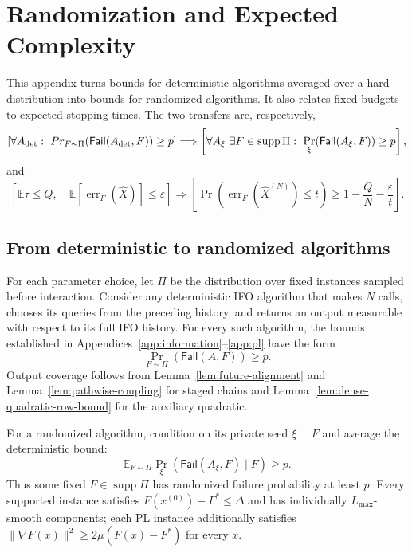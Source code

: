 \documentclass{article}
\newcommand{\E}{\mathbb{E}}
\theoremstyle{definition}
\begin{document}
\section{Randomization and Expected Complexity}
\label{app:stopping}

This appendix turns bounds for deterministic algorithms averaged over a hard
distribution into bounds for randomized algorithms.  It also relates fixed
budgets to expected stopping times.
The two transfers are, respectively,
\begin{equation*}
 \left[
 \forall A_{\rm det}:\ Pr_{F\sim\Pi}(\mathsf{Fail}(A_{\rm det},F))\ge p
 \right]
 \Longrightarrow
 \left[
 \forall A_\xi\ \exists F\in\operatorname{supp}\Pi:\
 \Pr_\xi(\mathsf{Fail}(A_\xi,F))\ge p
 \right],
\end{equation*}
and
\begin{equation*}
 \left[
 \E\tau\le Q,\quad
 \E[\operatorname{err}_F(\widehat X)]\le\varepsilon
 \right]
 \Longrightarrow
 \left[
 \Pr\!\left(\operatorname{err}_F(\widehat X^{(N)})\le t\right)
 \ge1-\frac{Q}{N}-\frac{\varepsilon}{t}
 \right].
\end{equation*}

\subsection{From deterministic to randomized algorithms}
\label{sec:deterministic-to-randomized}

For each parameter choice, let $\Pi$ be the distribution over fixed instances
sampled before interaction.  Consider any deterministic IFO algorithm that
makes $N$ calls, chooses its queries from the preceding history, and returns an
output measurable with respect to its full IFO history.  For every such
algorithm, the bounds established in
Appendices~\ref{app:information}--\ref{app:pl} have the form
\[
 \Pr_{F\sim\Pi}(\mathsf{Fail}(A,F))\ge p.
\]
Output coverage follows from Lemma~\ref{lem:future-alignment} and
Lemma~\ref{lem:pathwise-coupling}
for staged chains and Lemma~\ref{lem:dense-quadratic-row-bound} for the
auxiliary quadratic.

For a randomized algorithm, condition on its private seed $\xi\perp F$ and
average the deterministic bound:
\begin{equation}
 \E_{F\sim\Pi}\Pr_\xi(\mathsf{Fail}(A_\xi,F)\mid F)\ge p.
\end{equation}
Thus some fixed $F\in\operatorname{supp}\Pi$ has randomized failure probability
at least $p$.  Every supported instance satisfies
$F(x^{(0)})-F^*\le\Delta$ and has individually $L_{\max}$-smooth components;
each PL instance additionally satisfies
$\|\nabla F(x)\|^2\ge2\mu(F(x)-F^*)$ for every $x$.
\end{document}
